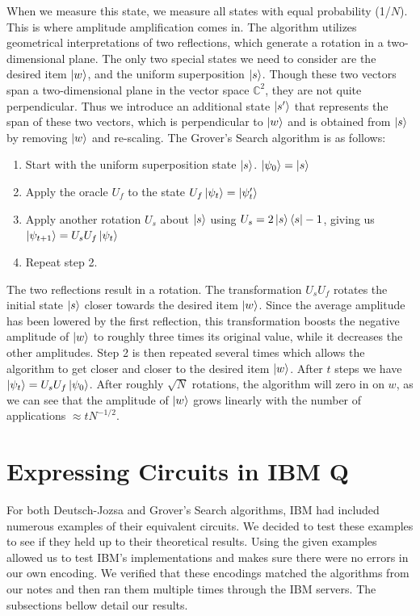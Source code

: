 \documentclass[12pt]{article}
\begin{document}
    \noindent
    When we measure this state, we measure all states with equal probability (1/$N$). This is where amplitude amplification comes in. The algorithm utilizes geometrical interpretations of two reflections, which generate a rotation in a two-dimensional plane. The only two special states we need to consider are the desired item $\ket{w}$,  and the uniform superposition $\ket{s}$. Though these two vectors span a two-dimensional plane in the vector space $\mathbb{C}^2$, they are not quite perpendicular. Thus we introduce an additional state $\ket{s^\prime}$  that represents the span of these two vectors, which is perpendicular to $\ket{w}$ and is obtained from $\ket{s}$ by removing $\ket{w}$ and re-scaling. The Grover’s Search algorithm is as follows:
    
    \smallskip
    
    \begin{enumerate}
        \item  Start with the uniform superposition state $\ket{s}$. $\ket{\psi_0} = \ket{s}$
        \item Apply the oracle $U_f$ to the state $U_f \ket{\psi_t} = \ket{\psi_t'}$
        \item Apply another rotation $U_s$ about $\ket{s}$ using $U_s = 2\ket{s}\bra{s}-1$, giving us $\ket{\psi_{t+1}} = U_{s}U_{f}\ket{\psi_t}$
        \item Repeat step 2.
    \end{enumerate}
    \noindent
    The two reflections result in a rotation. The transformation $U_{s}U_f$ rotates the initial state $\ket{s}$ closer towards the desired item $\ket{w}$. Since the average amplitude has been lowered by the first reflection, this transformation boosts the negative amplitude of $\ket{w}$ to roughly three times its original value, while it decreases the other amplitudes. Step 2 is then repeated several times which allows the algorithm to get closer and closer to the desired item $\ket{w}$. After $t$ steps we have $\ket{\psi_t} = U_{s}U_{f} \ket{\psi_0}$. After roughly $\sqrt{N}$ rotations, the algorithm will zero in on $w$, as we can see that the amplitude of $\ket{w}$ grows linearly with the number of applications $\approx tN^{-1/2}$.
        
\section{Expressing Circuits in IBM Q}
     For both Deutsch-Jozsa and Grover's Search algorithms, IBM had included numerous examples of their equivalent circuits. We decided to test these examples to see if they held up to their theoretical results. Using the given examples allowed us to test IBM's implementations and makes sure there were no errors in our own encoding. We verified that these encodings matched the algorithms from our notes and then ran them multiple times through the IBM servers. The subsections bellow detail our results.
    
\end{document}
